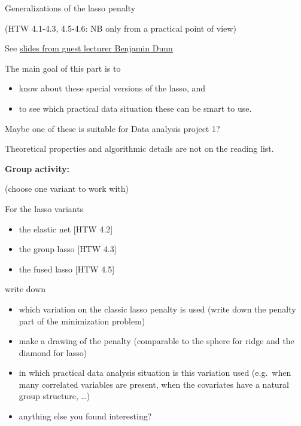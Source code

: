 \documentclass[
  ignorenonframetext,
]{beamer}
\providecommand{\tightlist}{%
  \setlength{\itemsep}{0pt}\setlength{\parskip}{0pt}}
\begin{document}
\begin{frame}

\begin{block}{Generalizations of the lasso penalty}

(HTW 4.1-4.3, 4.5-4.6: NB only from a practical point of view)

See \href{slides\%20link}{slides from guest lecturer Benjamin Dunn}

The main goal of this part is to

\begin{itemize}
\tightlist
\item
  know about these special versions of the lasso, and
\item
  to see which practical data situation these can be smart to use.
\end{itemize}

Maybe one of these is suitable for Data analysis project 1?

Theoretical properties and algorithmic details are not on the reading
list.

\end{block}

\end{frame}

\begin{frame}

\textbf{Group activity:}

(choose one variant to work with)

For the lasso variants

\begin{itemize}
\tightlist
\item
  the elastic net {[}HTW 4.2{]}
\item
  the group lasso {[}HTW 4.3{]}
\item
  the fused lasso {[}HTW 4.5{]} 
\end{itemize}

write down

\begin{itemize}
\tightlist
\item
  which variation on the classic lasso penalty is used (write down the
  penalty part of the minimization problem)
\item
  make a drawing of the penalty (comparable to the sphere for ridge and
  the diamond for lasso)
\item
  in which practical data analysis situation is this variation used
  (e.g.~when many correlated variables are present, when the covariates
  have a natural group structure, \ldots)
\item
  anything else you found interesting?
\end{itemize}

\end{frame}
\end{document}
